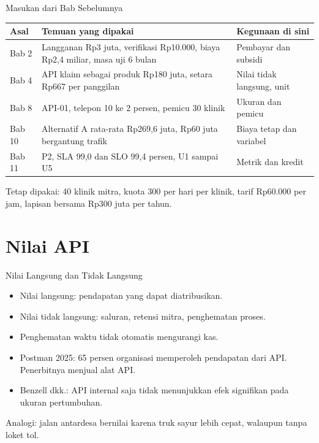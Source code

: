 \documentclass[aspectratio=169, table, 12pt]{beamer}
\begin{document}
\begin{frame}{{\Large Masukan dari Bab Sebelumnya}}
  \footnotesize
  \begin{tabularx}{\textwidth}{>{\raggedright\arraybackslash}p{1.3cm} >{\raggedright\arraybackslash}X >{\raggedright\arraybackslash}p{4.4cm}}
    \hline
    \textbf{Asal} & \textbf{Temuan yang dipakai} & \textbf{Kegunaan di sini} \\ \hline
    Bab 2 & Langganan Rp3 juta, verifikasi Rp10.000, biaya Rp2,4 miliar, masa uji 6 bulan & Pembayar dan subsidi \\ \hline
    Bab 4 & API klaim sebagai produk Rp180 juta, setara Rp667 per panggilan & Nilai tidak langsung, unit \\ \hline
    Bab 8 & API-01, telepon 10 ke 2 persen, pemicu 30 klinik & Ukuran dan pemicu \\ \hline
    Bab 10 & Alternatif A rata-rata Rp269,6 juta, Rp60 juta bergantung trafik & Biaya tetap dan variabel \\ \hline
    Bab 11 & P2, SLA 99,0 dan SLO 99,4 persen, U1 sampai U5 & Metrik dan kredit \\ \hline
  \end{tabularx}

  \vspace{8pt}
  \small Tetap dipakai: 40 klinik mitra, kuota 300 per hari per klinik, tarif Rp60.000 per jam, lapisan bersama Rp300 juta per tahun.
\end{frame}

\section{Nilai API}

\begin{frame}{{\Large Nilai Langsung dan Tidak Langsung}}
  \vspace{8pt}
  \begin{itemize}
    \item Nilai langsung: pendapatan yang dapat diatribusikan.
    \item Nilai tidak langsung: saluran, retensi mitra, penghematan proses.
    \item Penghematan waktu tidak otomatis mengurangi kas.
    \item Postman 2025: 65 persen organisasi memperoleh pendapatan dari API. Penerbitnya menjual alat API.
    \item Benzell dkk.: API internal saja tidak menunjukkan efek signifikan pada ukuran pertumbuhan.
  \end{itemize}
  \vspace{6pt}
  {\small Analogi: jalan antardesa bernilai karena truk sayur lebih cepat, walaupun tanpa loket tol.}
\end{frame}
\end{document}
